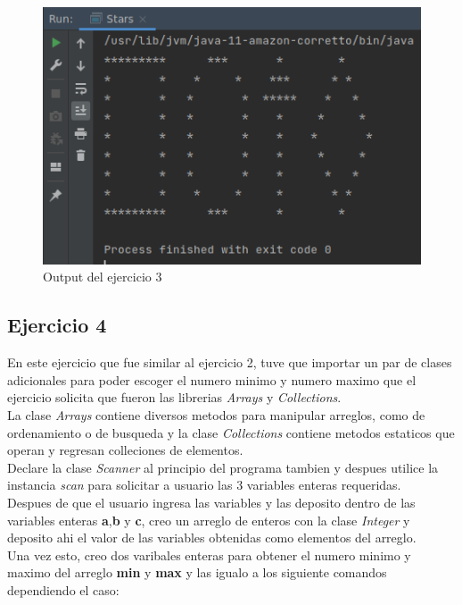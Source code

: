 \documentclass{article}
\begin{document}
 		\begin{figure}[H]
 			\centering
 			\includegraphics[scale = 0.6]{images/starsout}
 			\caption{Output del ejercicio 3}
 		\end{figure}
 		
 		\subsection{Ejercicio 4}
 		
 		En este ejercicio que fue similar al ejercicio 2, tuve que importar un par de clases adicionales para poder escoger el numero minimo y numero maximo que el ejercicio solicita que fueron las librerias \emph{Arrays} y \emph{Collections}.\\
 		
 		La clase \emph{Arrays} contiene diversos metodos para manipular arreglos, como de ordenamiento o de busqueda y la clase \emph{Collections} contiene metodos estaticos que operan y regresan colleciones de elementos.\\
 		
 		Declare la clase \emph{Scanner} al principio del programa tambien y despues utilice la instancia \emph{scan} para solicitar a usuario las 3 variables enteras requeridas.\\
 		
 		Despues de que el usuario ingresa las variables y las deposito dentro de las variables enteras \textbf{a},\textbf{b} y \textbf{c}, creo un arreglo de enteros con la clase \emph{Integer} y deposito ahi el valor de las variables obtenidas como elementos del arreglo.\\
 		
 		Una vez esto, creo dos varibales enteras para obtener el numero minimo y maximo del arreglo \textbf{min} y \textbf{max} y las igualo a los siguiente comandos dependiendo el caso:\\
 		
\end{document}
